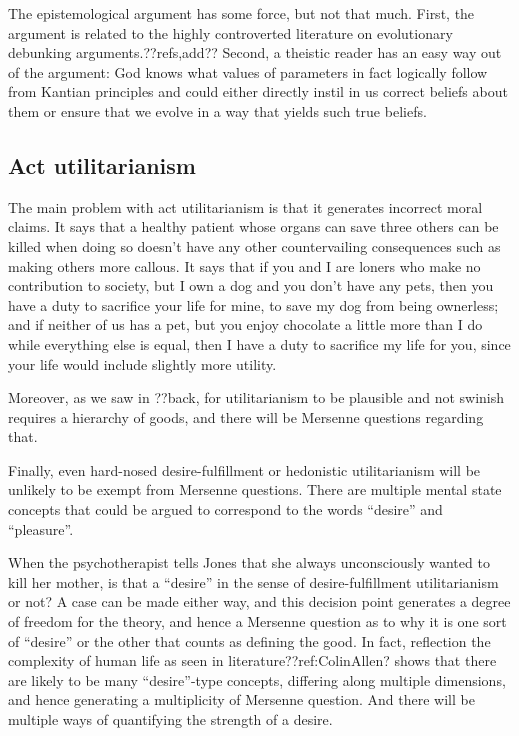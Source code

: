 The epistemological argument has some force, but not that much. First, the argument is related to the highly controverted
literature on evolutionary debunking arguments.??refs,add?? Second, a theistic reader has an easy way out of the argument:
God knows what values of parameters in fact logically follow from Kantian principles and could either directly instil in
us correct beliefs about them or ensure that we evolve in a way that yields such true beliefs.

\subsection{Act utilitarianism}
The main problem with act utilitarianism is that it generates incorrect moral claims. It says that a healthy patient
whose organs can save three others can be killed when doing so doesn't have any other countervailing consequences such
as making others more callous. It says that if you and I are loners who make no contribution to society, but I own
a dog and you don't have any pets, then you have a duty to sacrifice your life for mine, to save my dog from being
ownerless; and if neither of us has a pet, but you enjoy chocolate a little more than I do while everything else is
equal, then I have a duty to sacrifice my life for you, since your life would include slightly more utility.

Moreover, as we saw in ??back, for utilitarianism to be plausible and not swinish requires a hierarchy of goods,
and there will be Mersenne questions regarding that.

Finally, even hard-nosed desire-fulfillment or hedonistic utilitarianism will be unlikely to be exempt from Mersenne
questions. There are multiple mental state concepts that could be argued to correspond to the words ``desire'' and 
``pleasure''. 

When the psychotherapist tells Jones that she always unconsciously wanted to kill her mother, is that a ``desire''
in the sense of desire-fulfillment utilitarianism or not? A case can be made either way, and this decision point generates
a degree of freedom for the theory, and hence a Mersenne question as to why it is one sort of ``desire'' or the other that counts
as defining the good. In fact, reflection the complexity of human life as seen in literature??ref:ColinAllen? shows that there are likely
to be many ``desire''-type concepts, differing along multiple dimensions, and hence generating a multiplicity of Mersenne question.
And there will be multiple ways of quantifying the strength of a desire.

